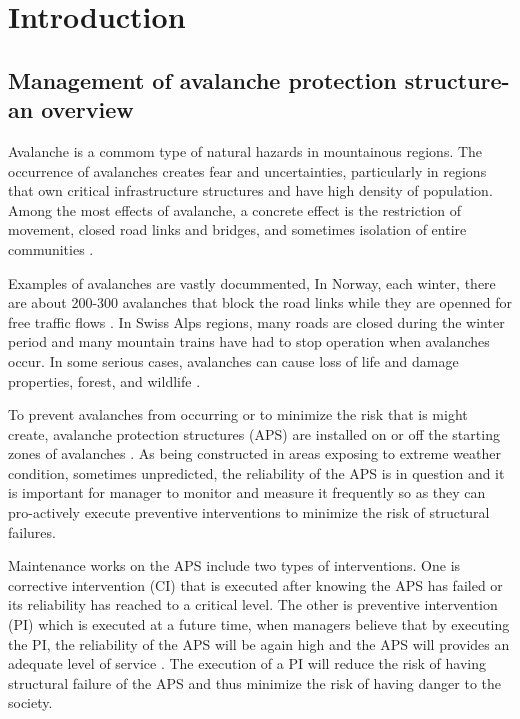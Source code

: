 \documentclass[fleqn]{article}
\begin{document}

\section{Introduction} \label{sec1}
\subsection{Management of avalanche protection structure-an overview}
Avalanche is a commom type of natural hazards in mountainous regions. The occurrence of avalanches creates fear and uncertainties, particularly in regions that own critical infrastructure structures and have high density of population. Among the most effects of avalanche, a concrete effect is the restriction of movement, closed road links and bridges, and sometimes isolation of entire communities \citep{Norem1994}. 

Examples of avalanches are vastly docummented, In Norway, each winter, there are about 200-300 avalanches that block the road links while they are openned for free traffic flows \citep{Norem1994}. In Swiss Alps regions, many roads are closed during the winter period and many mountain trains have had to stop operation when avalanches occur. In some serious cases, avalanches can cause loss of life and damage properties, forest, and wildlife \citep{Rudolf-Miklau2011}. 

To prevent avalanches from occurring or to minimize the risk that is might create, avalanche protection structures (APS) are installed on or off the starting zones of avalanches \citep{Sauermoser2011}. As being constructed in areas exposing to extreme weather condition, sometimes unpredicted, the reliability of the APS is in question and it is important for manager to monitor and measure it frequently so as they can pro-actively execute preventive interventions to minimize the risk of structural failures.

Maintenance works on the APS include two types of interventions. One is corrective intervention (CI) that is executed after knowing the APS has failed or its reliability has reached to a critical level. The other is preventive intervention (PI) which is executed at a future time, when managers believe that by executing the PI, the reliability of the APS will be again high and the APS will provides an adequate level of service \citep{Rudolf-Miklau2008,Rudolf-Miklau2011}. The execution of a PI will reduce the risk of having structural failure of the APS and thus minimize the risk of having danger to the society.
\end{document}
